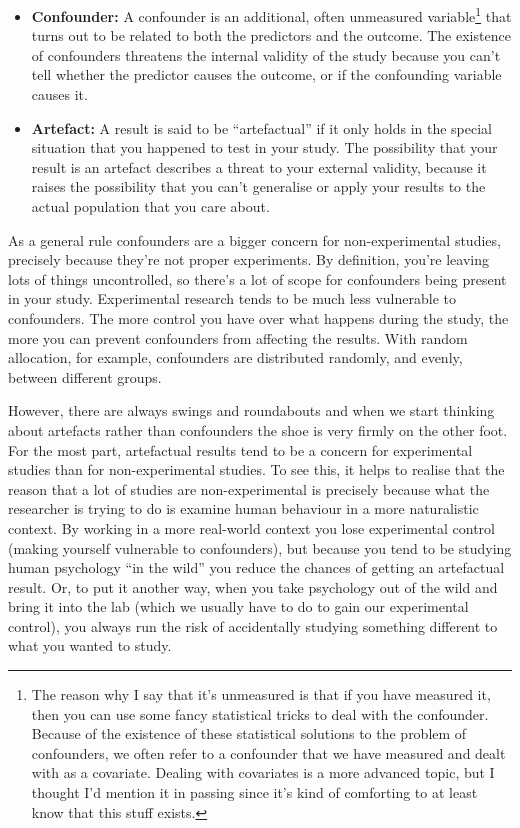 \documentclass[
]{book}
\providecommand{\tightlist}{%
  \setlength{\itemsep}{0pt}\setlength{\parskip}{0pt}}
\begin{document}
\begin{itemize}
\tightlist
\item
  \textbf{Confounder:} A confounder is an additional, often unmeasured variable\footnote{The reason why I say that it's unmeasured is that if you have measured it, then you can use some fancy statistical tricks to deal with the confounder. Because of the existence of these statistical solutions to the problem of confounders, we often refer to a confounder that we have measured and dealt with as a covariate. Dealing with covariates is a more advanced topic, but I thought I'd mention it in passing since it's kind of comforting to at least know that this stuff exists.} that turns out to be related to both the predictors and the outcome. The existence of confounders threatens the internal validity of the study because you can't tell whether the predictor causes the outcome, or if the confounding variable causes it.
\item
  \textbf{Artefact:} A result is said to be ``artefactual'' if it only holds in the special situation that you happened to test in your study. The possibility that your result is an artefact describes a threat to your external validity, because it raises the possibility that you can't generalise or apply your results to the actual population that you care about.
\end{itemize}

As a general rule confounders are a bigger concern for non-experimental studies, precisely because they're not proper experiments. By definition, you're leaving lots of things uncontrolled, so there's a lot of scope for confounders being present in your study. Experimental research tends to be much less vulnerable to confounders. The more control you have over what happens during the study, the more you can prevent confounders from affecting the results. With random allocation, for example, confounders are distributed randomly, and evenly, between different groups.

However, there are always swings and roundabouts and when we start thinking about artefacts rather than confounders the shoe is very firmly on the other foot. For the most part, artefactual results tend to be a concern for experimental studies than for non-experimental studies. To see this, it helps to realise that the reason that a lot of studies are non-experimental is precisely because what the researcher is trying to do is examine human behaviour in a more naturalistic context. By working in a more real-world context you lose experimental control (making yourself vulnerable to confounders), but because you tend to be studying human psychology ``in the wild'' you reduce the chances of getting an artefactual result. Or, to put it another way, when you take psychology out of the wild and bring it into the lab (which we usually have to do to gain our experimental control), you always run the risk of accidentally studying something different to what you wanted to study.
\end{document}
